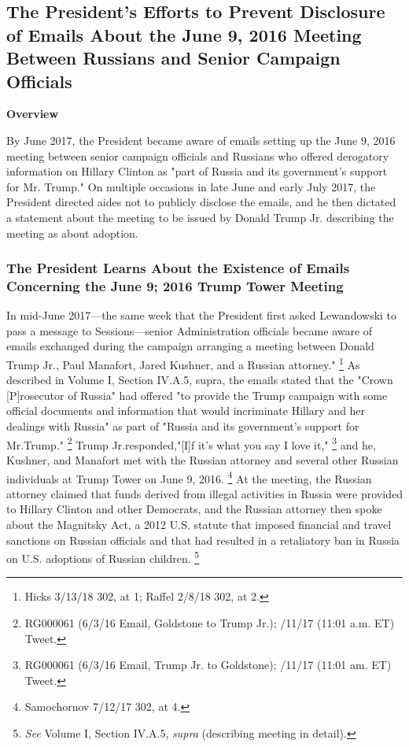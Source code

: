 {\subsection{The President's Efforts to Prevent Disclosure of Emails About the June 9, 2016 Meeting Between Russians and Senior Campaign Officials}

\begin{center}
\textbf{Overview}
\end{center}

By June 2017, the President became aware of emails setting up the June 9, 2016 meeting between senior campaign officials and Russians who offered derogatory information on Hillary Clinton as "part of Russia and its government's support for Mr. Trump."
On multiple occasions in late June and early July 2017, the President directed aides not to publicly disclose the emails, and he then dictated a statement about the meeting to be issued by Donald Trump Jr. describing the meeting as about adoption.

\subsubsection{The President Learns About the Existence of Emails Concerning the June 9; 2016 Trump Tower Meeting}

In mid-June 2017—the same week that the President first asked Lewandowski to pass a message to Sessions—senior Administration officials became aware of emails exchanged during the campaign arranging a meeting between Donald Trump Jr., Paul Manafort, Jared Kushner, and a Russian attorney."%
\footnote{Hicks 3/13/18 302, at 1;
Raffel 2/8/18 302, at 2.}
As described in Volume I, Section IV.A.5, supra, the emails stated that the "Crown [P]rosecutor of Russia" had offered "to provide the Trump campaign with some official documents and information that would incriminate Hillary and her dealings with Russia" as part of "Russia and its government's support for Mr.Trump."%
\footnote{RG000061 (6/3/16 Email, Goldstone to Trump Jr.);
/11/17 (11:01 a.m. ET) Tweet.}
Trump Jr.responded,"[I]f it's what you say I love it,"%
\footnote{RG000061 (6/3/16 Email, Trump Jr. to Goldstone);
/11/17 (11:01 am. ET) Tweet.}
and he, Kushner, and Manafort met with the Russian attorney and several other Russian individuals at Trump Tower on June 9, 2016.%
\footnote{Samochornov 7/12/17 302, at 4.}
At the meeting, the Russian attorney claimed that funds derived from illegal activities in Russia were provided to Hillary Clinton and other Democrats, and the Russian attorney then spoke about the Magnitsky Act, a 2012 U.S. statute that imposed financial and travel sanctions on Russian officials and that had resulted in a retaliatory ban in Russia on U.S. adoptions of Russian children.%
\footnote{\textit{See} Volume I, Section IV.A.5, \textit{supra} (describing meeting in detail).}

}
